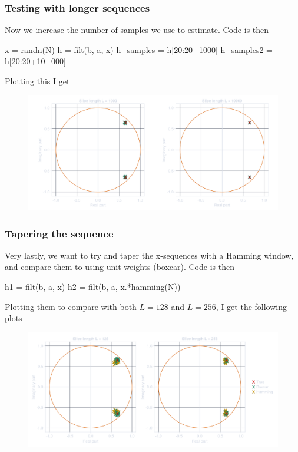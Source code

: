 \documentclass[compress,aspectratio=169]{beamer}
\begin{document}
\begin{frame}[fragile] %
    \frametitle{Testing with longer sequences}
    Now we increase the number of samples we use to estimate.
    Code is then
    \begin{jllisting}[gobble=8]
        x = randn(N)
        h = filt(b, a, x)
        h_samples = h[20:20+1000]
        h_samples2 = h[20:20+10_000]
    \end{jllisting}
    Plotting this I get
    \begin{figure}
        \includegraphics[width=0.7\columnwidth]{"../9.pdf"}
    \end{figure}

\end{frame}

\begin{frame}[fragile] %
    \frametitle{Tapering the sequence}
    Very lastly, we want to try and taper the x-sequences with a Hamming window,
    and compare them to using unit weights (boxcar).
    Code is then
    \begin{jllisting}[gobble=8]
        h1 = filt(b, a, x)
        h2 = filt(b, a, x.*hamming(N))
    \end{jllisting}

    Plotting them to compare with both $L=128$ and $L=256$, I get the following
    plots
    \begin{figure}
        \includegraphics[width=0.65\columnwidth]{"../10.pdf"}
    \end{figure}
\end{frame}
\end{document}
